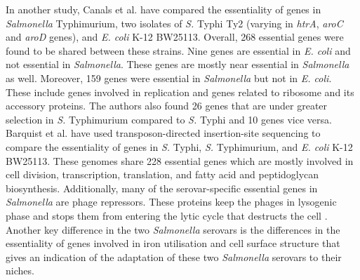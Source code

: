 \documentclass[12pt,letterpaper]{article}
\begin{document}
In another study, Canals et al. \cite{canals_high-throughput_2012} have compared the essentiality of genes in \textit{Salmonella} Typhimurium, two isolates of \textit{S.} Typhi Ty2 (varying in \textit{htrA}, \textit{aroC} and \textit{aroD} genes), and \textit{E. coli} K-12 BW25113. Overall, 268 essential genes were found to be shared between these strains. Nine genes are essential in \textit{E. coli} and not essential in \textit{Salmonella}. These genes are mostly near essential in \textit{Salmonella} as well. %
Moreover, 159 genes were essential in \textit{Salmonella} but not in \textit{E. coli}. These include genes involved in replication and genes related to ribosome and its accessory proteins. The authors also found 26 genes that are under greater selection in \textit{S.} Typhimurium compared to \textit{S.} Typhi and 10 genes vice versa. Barquist et al. \cite{barquist_comparison_2013} have used transposon-directed insertion-site sequencing to compare the essentiality of genes in \textit{S.} Typhi, \textit{S.} Typhimurium, and \textit{E. coli} K-12 BW25113. These genomes share 228 essential genes which are mostly involved in cell division, transcription, translation, and fatty acid and peptidoglycan biosynthesis. Additionally, many of the serovar-specific essential genes in \textit{Salmonella} are phage repressors. These proteins keep the phages in lysogenic phase and stops them from entering the lytic cycle that destructs the cell \cite{echols_establishment_1971}. Another key difference in the two \textit{Salmonella} serovars is the differences in the essentiality of genes involved in iron utilisation and cell surface structure that gives an indication of the adaptation of these two \textit{Salmonella} serovars to their niches. %
\end{document}
